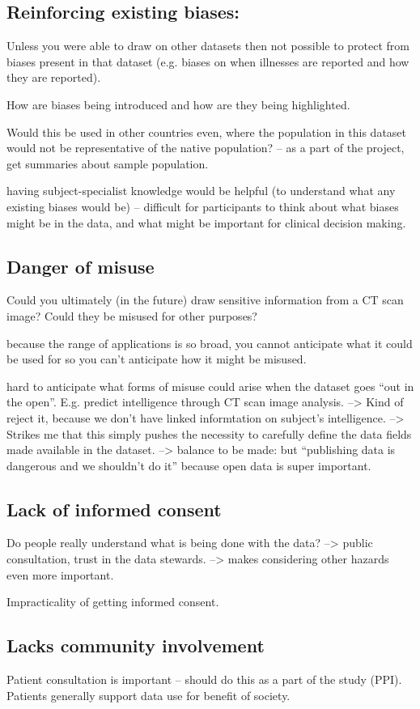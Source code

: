 \documentclass{article}
\begin{document}
 \subsection{Reinforcing existing biases:}


 Unless you were able to draw on other datasets then not possible to
protect from biases present in that dataset (e.g. biases on when
illnesses are reported and how they are reported).

 How are biases being introduced and how are they being highlighted.

 Would this be used in other countries even, where the population
  in this dataset would not be representative of the native
  population?
  -- as a part of the project, get summaries about sample population.
  
 having subject-specialist knowledge would be helpful (to
  understand what any existing biases would be) -- difficult for
  participants to think about what biases might be in the data, and
  what might be important for clinical decision making.

  
\subsection{Danger of misuse}

 Could you ultimately (in the future) draw sensitive information
  from a CT scan image? Could they be misused for other purposes?

 because the range of applications is so broad, you cannot
  anticipate what it could be used for so you can't anticipate how it
  might be misused.

 hard to anticipate what forms of misuse could arise when the
  dataset goes ``out in the open''. E.g. predict intelligence through
  CT scan image analysis.
  --> Kind of reject it, because we don't have linked informtation
  on subject's intelligence.
  --> Strikes me that this simply pushes the necessity to carefully
  define the data fields made available in the dataset.
  --> balance to be made: but ``publishing data is
  dangerous and we shouldn't do it'' because open data is super
  important.

  \subsection{Lack of informed consent}

 Do people really understand what is being done with the
  data?
  --> public consultation, trust in the data stewards.
  --> makes considering other hazards even more important.

 Impracticality of getting informed consent.

\subsection{Lacks community involvement}
 Patient consultation is important -- should do this as a part of
  the study (PPI).  
 Patients generally support data use for benefit of society.



\printbibliography
\end{document}
